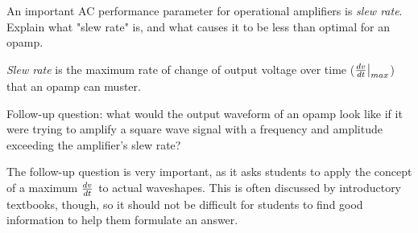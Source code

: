 

An important AC performance parameter for operational amplifiers is {\it slew rate}.  Explain what "slew rate" is, and what causes it to be less than optimal for an opamp.







{\it Slew rate} is the maximum rate of change of output voltage over time (${dv \over dt}\big|_{max}$) that an opamp can muster.

\vskip 10pt

Follow-up question: what would the output waveform of an opamp look like if it were trying to amplify a square wave signal with a frequency and amplitude exceeding the amplifier's slew rate?







The follow-up question is very important, as it asks students to apply the concept of a maximum ${dv \over dt}$ to actual waveshapes.  This is often discussed by introductory textbooks, though, so it should not be difficult for students to find good information to help them formulate an answer.




